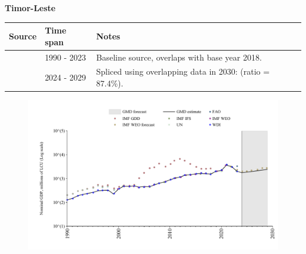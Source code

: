\documentclass[12pt,a4paper,landscape]{article}
\begin{document}
\begin{adjustbox}{max totalsize={\paperwidth}{\paperheight},center}
\begin{minipage}[t][\textheight][t]{\textwidth}
\vspace*{0.5cm}
{}
\begin{center}
{\Large\bfseries Timor-Leste}
\end{center}
\vspace{0.5cm}
\begin{table}[H]
\centering
\small
\begin{tabular}{|l|l|l|}
\hline
\textbf{Source} & \textbf{Time span} & \textbf{Notes} \\
\hline
\rowcolor{white}\cite{WDI}& 1990 - 2023 &Baseline source, overlaps with base year 2018.\\
\rowcolor{lightgray}\cite{IMF_WEO_forecast}& 2024 - 2029 &Spliced using overlapping data in 2030: (ratio = 87.4\%).\\
\hline
\end{tabular}
\end{table}
\begin{figure}[H]
\centering
\includegraphics[width=\textwidth,height=0.6\textheight,keepaspectratio]{graphs/TLS_nGDP.pdf}
\end{figure}
\end{minipage}
\end{adjustbox}
\end{document}

